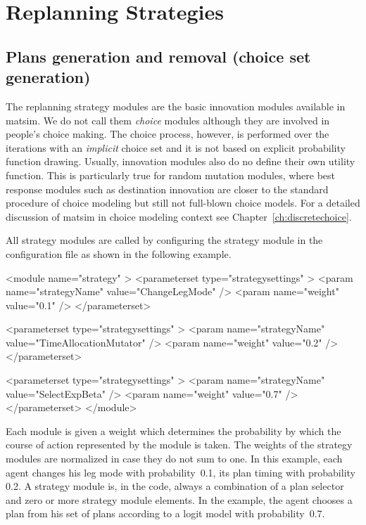 
\section{Replanning Strategies}
\label{sec:strategymodules}

\subsection{Plans generation and removal (choice set generation)}


The replanning strategy modules are the basic innovation modules available in \gls{matsim}. We do not call them \emph{choice} modules although they are involved in people's choice making. The choice process, however, is performed over the iterations with an \emph{implicit} choice set and it is not based on explicit probability function drawing. Usually, innovation modules also do no define their own utility function. This is particularly true for random mutation modules, where best response modules such as destination innovation are closer to the standard procedure of choice modeling but still not full-blown choice models. For a detailed discussion of \gls{matsim} in choice modeling context see Chapter~\ref{ch:discretechoice}.

All strategy modules are called by configuring the strategy module in the configuration file as shown in the following example.
%
\begin{xml}
<module name="strategy" >
	<parameterset type="strategysettings" >
		<param name="strategyName" value="ChangeLegMode" />
		<param name="weight" value="0.1" />
	</parameterset>
	
	<parameterset type="strategysettings" >
		<param name="strategyName" value="TimeAllocationMutator" />
		<param name="weight" value="0.2" />
	</parameterset>
	
	<parameterset type="strategysettings" >
		<param name="strategyName" value="SelectExpBeta" />
		<param name="weight" value="0.7" />
	</parameterset>
</module>
\end{xml}
%
Each module is given a weight which determines the probability by which the course of action represented by the module is taken. The weights of the strategy modules are normalized in case they do not sum to one. In this example, each agent changes his leg mode with probability~0.1, its plan timing with probability 0.2. A strategy module is, in the code, always a combination of a plan selector and zero or more strategy module elements. In the example, the agent chooses a plan from his set of plans according to a logit model with probability~0.7. 

